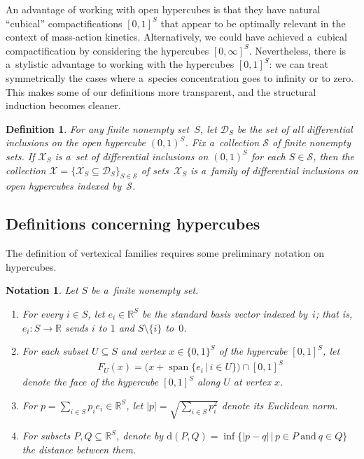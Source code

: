 \documentclass[pdftex]{sigma}
\newtheorem{Definition}[Theorem]{Definition}
\newtheorem{Notation}[Theorem]{Notation}
\begin{document}
An advantage of working with open hypercubes is that they have natural ``cubical'' compactif\/ications $[0,1]^S$ that
appear to be optimally relevant in the context of mass-action kinetics.
Alternatively, we could have achieved a~cubical compactif\/ication by considering the hypercubes $[0,\infty]^S$.
Nevertheless, there is a~stylistic advantage to working with the hypercubes $[0,1]^S$: we can treat symmetrically the
cases where a~species concentration goes to inf\/inity or to zero.
This makes some of our def\/initions more transparent, and the structural induction becomes cleaner.
\begin{Definition}
\label{def:diff_incl_fam}
For any f\/inite nonempty set~$S$, let $\mathcal D_S$ be the set of all dif\/ferential inclusions on the open hypercube
$(0,1)^S$.
Fix a~collection $\mathcal S$ of f\/inite nonempty sets.
If $\mathcal X_S$ is a~set of dif\/ferential inclusions on $(0,1)^S$ for each $S\in\mathcal S$, then the collection
$\mathcal X=\{\mathcal X_S\subseteq\mathcal D_S\}_{S\in\mathcal S}$ of sets~$\mathcal X_S$ is a~\emph{family of
differential inclusions on open hypercubes indexed by~$\mathcal S$}.
\end{Definition}

\subsection{Definitions concerning hypercubes}
\label{sub:hypercubes}

The def\/inition of vertexical families requires some preliminary notation on hypercubes.
\begin{Notation}
Let $S$ be a~f\/inite nonempty set.
\begin{enumerate}\itemsep=0pt
\item For every $i\in S$, let $e_i\in\mathbb{R}^S$ be the standard basis vector indexed by~$i$; that is,
$e_i:S\to\mathbb{R}$ sends $i$ to $1$ and $S\setminus\{i\}$ to~$0$.
\item For each subset $U\subseteq S$ and vertex $x\in\{0,1\}^S$ of the hypercube $[0,1]^S$, let
\begin{gather*}
F_U(x)=\big(x+\operatorname{span}\{e_i\,|\, i\in U\}\big)\cap[0,1]^S
\end{gather*}
denote the face of the hypercube $[0,1]^S$ along $U$ at vertex $x$.
\item For $p=\sum\limits_{i\in S}p_i e_i\in\mathbb{R}^S$, let $|p|=\sqrt{\sum\limits_{i\in S}p_i^2}$ denote its Euclidean norm.
\item For subsets $P,Q\subseteq\mathbb{R}^S$, denote by $\mathrm{d}(P,Q)=\inf\big\{|p-q|\,\big|\, p\in P~\text{and}~q\in
Q\big\}$ the distance between them.
\end{enumerate}
\end{Notation}
\end{document}

